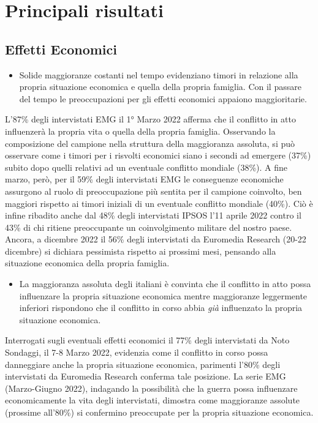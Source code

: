 \documentclass[
]{book}
\providecommand{\tightlist}{%
  \setlength{\itemsep}{0pt}\setlength{\parskip}{0pt}}
\begin{document}
\hypertarget{principali-risultati-4}{%
\section{Principali risultati}\label{principali-risultati-4}}

\hypertarget{effetti-economici}{%
\subsection{Effetti Economici}\label{effetti-economici}}

\begin{itemize}
\tightlist
\item
  Solide maggioranze costanti nel tempo evidenziano timori in relazione alla propria situazione economica e quella della propria famiglia. Con il passare del tempo le preoccupazioni per gli effetti economici appaiono maggioritarie.
\end{itemize}

L'87\% degli intervistati EMG il 1° Marzo 2022 afferma che il conflitto in atto influenzerà la propria vita o quella della propria famiglia. Osservando la composizione del campione nella struttura della maggioranza assoluta, si può osservare come i timori per i risvolti economici siano i secondi ad emergere (37\%) subito dopo quelli relativi ad un eventuale conflitto mondiale (38\%). A fine marzo, però, per il 59\% degli intervistati EMG le conseguenze economiche assurgono al ruolo di preoccupazione più sentita per il campione coinvolto, ben maggiori rispetto ai timori iniziali di un eventuale conflitto mondiale (40\%). Ciò è infine ribadito anche dal 48\% degli intervistati IPSOS l'11 aprile 2022 contro il 43\% di chi ritiene preoccupante un coinvolgimento militare del nostro paese. Ancora, a dicembre 2022 il 56\% degli intervistati da Euromedia Research (20-22 dicembre) si dichiara pessimista rispetto ai prossimi mesi, pensando alla situazione economica della propria famiglia.

\begin{itemize}
\tightlist
\item
  La maggioranza assoluta degli italiani è convinta che il conflitto in atto possa influenzare la propria situazione economica mentre maggioranze leggermente inferiori rispondono che il conflitto in corso abbia \emph{già} influenzato la propria situazione economica.
\end{itemize}

Interrogati sugli eventuali effetti economici il 77\% degli intervistati da Noto Sondaggi, il 7-8 Marzo 2022, evidenzia come il conflitto in corso possa danneggiare anche la propria situazione economica, parimenti l'80\% degli intervistati da Euromedia Research conferma tale posizione. La serie EMG (Marzo-Giugno 2022), indagando la possibilità che la guerra possa influenzare economicamente la vita degli intervistati, dimostra come maggioranze assolute (prossime all'80\%) si confermino preoccupate per la propria situazione economica.
\end{document}
